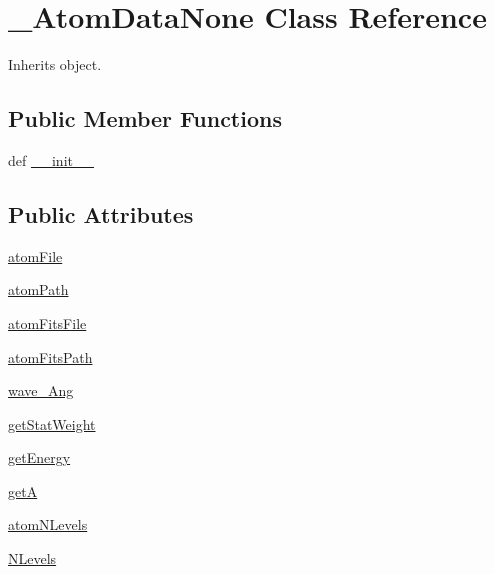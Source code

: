 \hypertarget{classpyneb_1_1core_1_1pynebcore_1_1___atom_data_none}{\section{\-\_\-\-Atom\-Data\-None Class Reference}
\label{classpyneb_1_1core_1_1pynebcore_1_1___atom_data_none}
}


Inherits object.

\subsection*{Public Member Functions}
\begin{DoxyCompactItemize}
\item 
def \hyperlink{classpyneb_1_1core_1_1pynebcore_1_1___atom_data_none_ac775ee34451fdfa742b318538164070e}{\-\_\-\-\_\-init\-\_\-\-\_\-}
\end{DoxyCompactItemize}
\subsection*{Public Attributes}
\begin{DoxyCompactItemize}
\item 
\hyperlink{classpyneb_1_1core_1_1pynebcore_1_1___atom_data_none_afa3c4660b3bcf1e2c199413048b9209e}{atom\-File}
\item 
\hyperlink{classpyneb_1_1core_1_1pynebcore_1_1___atom_data_none_a18178a28ecf0c7f251d0974c2097b214}{atom\-Path}
\item 
\hyperlink{classpyneb_1_1core_1_1pynebcore_1_1___atom_data_none_a80c24f287a25f67b489b472164691ea6}{atom\-Fits\-File}
\item 
\hyperlink{classpyneb_1_1core_1_1pynebcore_1_1___atom_data_none_a8d37532338fe8cf09d17000a7ae46d53}{atom\-Fits\-Path}
\item 
\hyperlink{classpyneb_1_1core_1_1pynebcore_1_1___atom_data_none_ab5130f33e76a12670614a4ecf47211b0}{wave\-\_\-\-Ang}
\item 
\hyperlink{classpyneb_1_1core_1_1pynebcore_1_1___atom_data_none_a76da9219880b92ab31bfbff268b9ddc9}{get\-Stat\-Weight}
\item 
\hyperlink{classpyneb_1_1core_1_1pynebcore_1_1___atom_data_none_a25f8bf6829f1707a2e51c73ed35c8301}{get\-Energy}
\item 
\hyperlink{classpyneb_1_1core_1_1pynebcore_1_1___atom_data_none_a8833ed6e4343a554784ea8642762d3dd}{get\-A}
\item 
\hyperlink{classpyneb_1_1core_1_1pynebcore_1_1___atom_data_none_ae9ca7d9b8e6463826cd148ff606cbc1c}{atom\-N\-Levels}
\item 
\hyperlink{classpyneb_1_1core_1_1pynebcore_1_1___atom_data_none_a4d45fe163c2108853ab418386bf4da56}{N\-Levels}
\end{DoxyCompactItemize}


